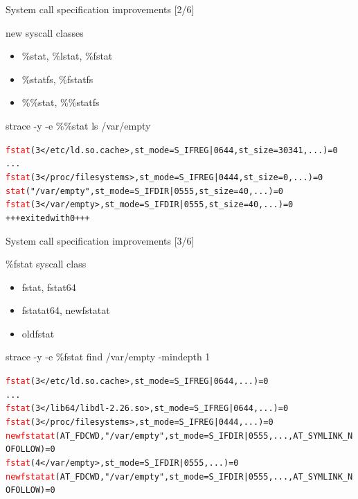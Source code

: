 \documentclass[unicode]{beamer}
\begin{document}
\begin{frame}[fragile]{System call specification improvements \hfill [2/6]}
\begin{block}{\large new syscall classes}
\begin{itemize}
	\item \%stat, \%lstat, \%fstat
	\item \%statfs, \%fstatfs
	\item \%\%stat, \%\%statfs
\end{itemize}
\end{block}
\begin{block}{\large strace -y -e \%\%stat ls /var/empty}
\begin{alltt}
\textcolor{red}{fstat}(3</etc/ld.so.cache>, {st_mode=S_IFREG|0644, st_size=30341, ...}) = 0
...
\textcolor{red}{fstat}(3</proc/filesystems>, {st_mode=S_IFREG|0444, st_size=0, ...}) = 0
\textcolor{red}{stat}("/var/empty", {st_mode=S_IFDIR|0555, st_size=40, ...}) = 0
\textcolor{red}{fstat}(3</var/empty>, {st_mode=S_IFDIR|0555, st_size=40, ...}) = 0
+++ exited with 0 +++
\end{alltt}
\end{block}
\end{frame}

\begin{frame}[fragile]{System call specification improvements \hfill [3/6]}
\begin{block}{\large \%fstat syscall class}
\begin{itemize}
	\item fstat, fstat64
	\item fstatat64, newfstatat
	\item oldfstat
\end{itemize}
\end{block}
\begin{block}{\large strace -y -e \%fstat find /var/empty -mindepth 1}
\begin{alltt}
\textcolor{red}{fstat}(3</etc/ld.so.cache>, {st_mode=S_IFREG|0644, ...}) = 0
...
\textcolor{red}{fstat}(3</lib64/libdl-2.26.so>, {st_mode=S_IFREG|0644, ...}) = 0
\textcolor{red}{fstat}(3</proc/filesystems>, {st_mode=S_IFREG|0444, ...}) = 0
\textcolor{red}{newfstatat}(AT_FDCWD, "/var/empty", {st_mode=S_IFDIR|0555, ...}, AT_SYMLINK_NOFOLLOW) = 0
\textcolor{red}{fstat}(4</var/empty>, {st_mode=S_IFDIR|0555, ...}) = 0
\textcolor{red}{newfstatat}(AT_FDCWD, "/var/empty", {st_mode=S_IFDIR|0555, ...}, AT_SYMLINK_NOFOLLOW) = 0
\end{alltt}
\end{block}
\end{frame}
\end{document}
